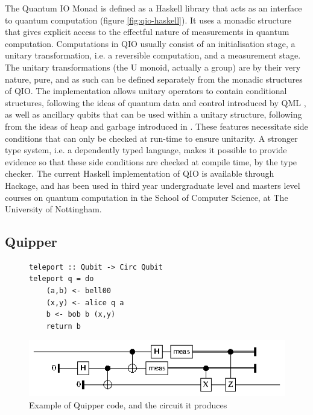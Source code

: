 \documentclass[a4paper]{article}
\begin{document}
The Quantum IO Monad  is defined as a
Haskell library that acts as an interface to quantum computation
(figure \ref{fig:qio-haskell}). It uses a monadic structure that gives
explicit access to the effectful nature of measurements in quantum
computation.  Computations in QIO usually consist of an initialisation
stage, a unitary transformation, i.e. a reversible computation, and a
measurement stage. The unitary transformations (the U monoid, actually
a group) are by their very nature, pure, and as such can be defined
separately from the monadic structures of QIO. The implementation
allows unitary operators to contain conditional structures, following
the ideas of quantum data and control introduced by QML
, as well as ancillary qubits that can be used
within a unitary structure, following from the ideas of heap and
garbage introduced in . These features
necessitate side conditions that can only be checked at run-time to
ensure unitarity. A stronger type system, i.e. a dependently typed
language, makes it 
possible to provide evidence so that these side conditions are
checked at compile time, by the type checker. The current Haskell
implementation of QIO is available through Hackage,
and has been used in third year undergraduate level and masters level
courses on quantum computation in the School of Computer Science, at
The University of Nottingham.

\subsection*{Quipper}

\begin{figure}
\begin{verbatim}
teleport :: Qubit -> Circ Qubit
teleport q = do
    (a,b) <- bell00
    (x,y) <- alice q a
    b <- bob b (x,y)
    return b
\end{verbatim}
\includegraphics[width=\columnwidth]{teleport.eps}
\caption{Example of Quipper code, and the circuit it produces}\label{fig:quipper-circ}
\end{figure}
\end{document}
